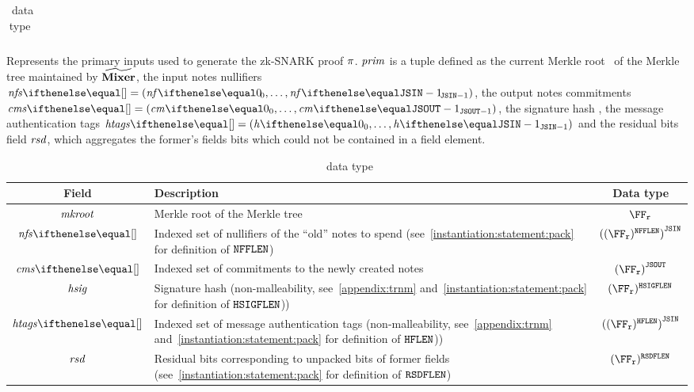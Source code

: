 \begin{description}
\begin{table}[H]
\begin{tabular}{cp{20em}c}
        \end{tabular}
        \caption{\jsInputDType~data type}\label{zeth-protocol:tab:jsinput}
        \end{table}
    \item[\primInputDType]
    Represents the primary inputs used to generate the zk-SNARK proof $\mathit{\pi}$. $\mathit{prim}$ is a tuple defined as the current Merkle root \mkroot~of the Merkle tree maintained by $\widetilde{\mathbf{Mixer}}$, the input notes nullifiers $\nfs{} = \smalltuple{\nf{0}, \ldots, \nf{\jsin - 1}}$, the output notes commitments $\cms{} = \smalltuple{\cm{0}, \ldots, \cm{\jsout - 1}}$, the signature hash \hsig, the message authentication tags $\htags{} = \smalltuple{\htag{0}, \ldots, \htag{\jsin-1}}$ and the residual bits field $\mathit{rsd}$, which aggregates the former's fields bits which could not be contained in a field element.
        \begin{table}[H]
        \centering
        \begin{tabular}{cp{20em}c}
            Field & Description & Data type\\ \toprule
            $\mathit{mkroot}$ & Merkle root of the Merkle tree & $\FFx{\rCURVE}$ \\ \midrule
            $\nfs{}$ & Indexed set of nullifiers of the ``old'' notes to spend (see~\cref{instantiation:statement:pack} for definition of $\mathtt{NFFLEN}$) & ${((\FFx{\rCURVE})^{\nfFLen})}^{\jsin}$\\ \midrule
            $\cms{}$ & Indexed set of commitments to the newly created notes & ${(\FFx{\rCURVE})}^{\jsout}$\\ \midrule
            $\mathit{hsig}$ & Signature hash (non-malleability, see~\cref{appendix:trnm} and~\cref{instantiation:statement:pack} for definition of $\mathtt{HSIGFLEN}$)) & $(\FFx{\rCURVE})^{\hsigFLen}$\\ \midrule
            $\htags{}$ & Indexed set of message authentication tags (non-malleability, see~\cref{appendix:trnm} and~\cref{instantiation:statement:pack} for definition of $\mathtt{HFLEN}$)) & ${((\FFx{\rCURVE})^{\htagFLen})}^{\jsin}$\\ \midrule
            $\mathit{rsd}$ & Residual bits corresponding to unpacked bits of former fields (see~\cref{instantiation:statement:pack} for definition of $\mathtt{RSDFLEN}$) & $(\FFx{\rCURVE})^{\resBitsFLen}$\\ \bottomrule
        \end{tabular}
        \caption{\primInputDType~data type}\label{zeth-protocol:tab:priminputs}
        \end{table}

\end{description}
